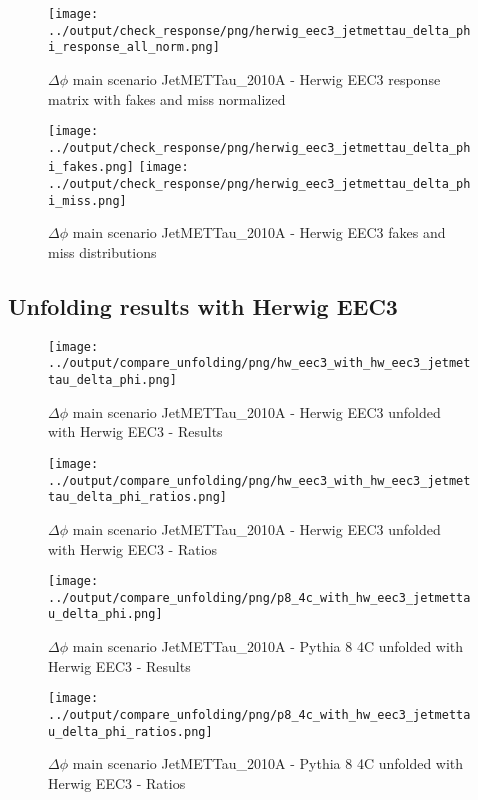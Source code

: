 \documentclass[11pt]{book}
\begin{document}
\begin{figure}[ht]
\centering
\texttt{[image: ../output/check\_response/png/herwig\_eec3\_jetmettau\_delta\_phi\_response\_all\_norm.png]}
\caption{$\Delta\phi$ main scenario JetMETTau\_2010A - Herwig EEC3 response matrix with fakes and miss normalized}
\label{hw_eec3_jetmettau_delta_phi_response_all_norm}
\end{figure}

\begin{figure}[ht]
\centering
\texttt{[image: ../output/check\_response/png/herwig\_eec3\_jetmettau\_delta\_phi\_fakes.png]}
\texttt{[image: ../output/check\_response/png/herwig\_eec3\_jetmettau\_delta\_phi\_miss.png]}
\caption{$\Delta\phi$ main scenario JetMETTau\_2010A - Herwig EEC3 fakes and miss distributions}
\label{hw_eec3_jetmettau_delta_phi_fakesmiss}
\end{figure}



\clearpage
\subsection{Unfolding results with Herwig EEC3}

\begin{figure}[ht]
\centering
\texttt{[image: ../output/compare\_unfolding/png/hw\_eec3\_with\_hw\_eec3\_jetmettau\_delta\_phi.png]}
\caption{$\Delta\phi$ main scenario JetMETTau\_2010A - Herwig EEC3 unfolded with Herwig EEC3 - Results}
\label{hw_eec3_hw_eec3_jetmettau_delta_phi_a}
\end{figure}

\begin{figure}[ht]
\centering
\texttt{[image: ../output/compare\_unfolding/png/hw\_eec3\_with\_hw\_eec3\_jetmettau\_delta\_phi\_ratios.png]}
\caption{$\Delta\phi$ main scenario JetMETTau\_2010A - Herwig EEC3 unfolded with Herwig EEC3 - Ratios}
\label{hw_eec3_jetmettau_delta_phi_b}
\end{figure}


\begin{figure}[ht]
\centering
\texttt{[image: ../output/compare\_unfolding/png/p8\_4c\_with\_hw\_eec3\_jetmettau\_delta\_phi.png]}
\caption{$\Delta\phi$ main scenario JetMETTau\_2010A - Pythia 8 4C unfolded with Herwig EEC3 - Results}
\label{p8_hw_eec3_jetmettau_delta_phi_a}
\end{figure}

\begin{figure}[ht]
\centering
\texttt{[image: ../output/compare\_unfolding/png/p8\_4c\_with\_hw\_eec3\_jetmettau\_delta\_phi\_ratios.png]}
\caption{$\Delta\phi$ main scenario JetMETTau\_2010A - Pythia 8 4C unfolded with Herwig EEC3 - Ratios}
\label{p8_hw_eec3_jetmettau_delta_phi_b}
\end{figure}
\end{document}
